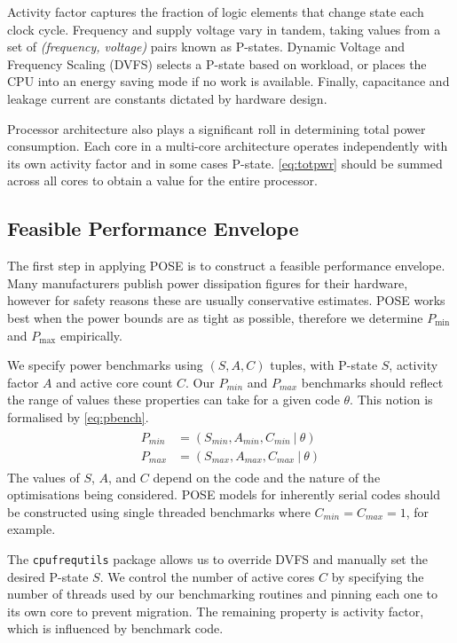 Activity factor captures the fraction of logic elements that change state each clock cycle.
Frequency and supply voltage vary in tandem, taking values from a set of \textit{(frequency, voltage)} pairs known as P-states.
Dynamic Voltage and Frequency Scaling (DVFS) selects a P-state based on workload, or places the CPU into an energy saving mode if no work is available.
Finally, capacitance and leakage current are constants dictated by hardware design.

Processor architecture also plays a significant roll in determining total power consumption.
Each core in a multi-core architecture operates independently with its own activity factor and in some cases P-state.
\autoref{eq:totpwr} should be summed across all cores to obtain a value for the entire processor.

\subsection{Feasible Performance Envelope}
\noindent
The first step in applying POSE is to construct a feasible performance envelope.
Many manufacturers publish power dissipation figures for their hardware, however for safety reasons these are usually conservative estimates.
POSE works best when the power bounds are as tight as possible, therefore we determine $P_{\min}$ and $P_{\max}$ empirically.

We specify power benchmarks using $(S,A,C)$ tuples, with P-state $S$, activity factor $A$ and active core count $C$.
Our $P_{min}$ and $P_{max}$ benchmarks should reflect the range of values these properties can take for a given code $\theta$.
This notion is formalised by \autoref{eq:pbench}.
\begin{align}
  \label{eq:pbench}
  \begin{split}
    P_{min} &= (S_{min}, A_{min}, C_{min}~\vert~\theta) \\
    P_{max} &= (S_{max}, A_{max}, C_{max}~\vert~\theta) 
  \end{split}
\end{align}
The values of $S$, $A$, and $C$ depend on the code and the nature of the optimisations being considered.
POSE models for inherently serial codes should be constructed using single threaded benchmarks where $C_{min} = C_{max} = 1$, for example.

The \texttt{cpufrequtils} package allows us to override DVFS and manually set the desired P-state $S$.
We control the number of active cores $C$ by specifying the number of threads used by our benchmarking routines and pinning each one to its own core to prevent migration.
The remaining property is activity factor, which is influenced by benchmark code.

